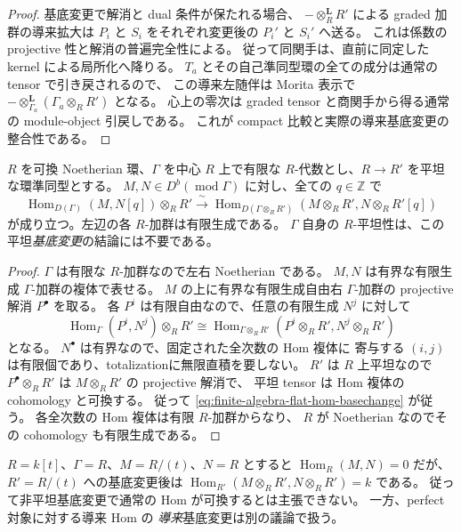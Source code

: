 \begin{proof}
基底変更で解消と dual 条件が保たれる場合、
$-\otimes_R^{\mathbf L}R'$ による graded 加群の導来拡大は
$P_i$ と $S_i$ をそれぞれ変更後の $P_i'$ と $S_i'$ へ送る。
これは係数の projective 性と解消の普遍完全性による。
従って同関手は、直前に同定した kernel による局所化へ降りる。
$T_a$ とその自己準同型環の全ての成分は通常の tensor で引き戻されるので、
この導来左随伴は Morita 表示で
$-\otimes_{\Gamma_a}^{\mathbf L}(\Gamma_a\otimes_RR')$ となる。
心上の零次は graded tensor と商関手から得る通常の module-object 引戻しである。
これが compact 比較と実際の導来基底変更の整合性である。
\end{proof}

\begin{lemma}
\label{lem:finite-algebra-flat-hom-basechange}
$R$ を可換 Noetherian 環、$\Gamma$ を中心 $R$ 上で有限な
$R$-代数とし、$R\to R'$ を平坦な環準同型とする。
$M,N\in D^b(\operatorname{mod}\Gamma)$ に対し、全ての $q\in\mathbb Z$ で
\[
 \operatorname{Hom}_{D(\Gamma)}(M,N[q])\otimes_RR'
 \xrightarrow{\ \sim\ }
 \operatorname{Hom}_{D(\Gamma\otimes_RR')}
     (M\otimes_RR',N\otimes_RR'[q])
 \tag{FA-BC}\label{eq:finite-algebra-flat-hom-basechange}
\]
が成り立つ。左辺の各 $R$-加群は有限生成である。
$\Gamma$ 自身の $R$-平坦性は、この平坦\emph{基底変更}の結論には不要である。
\end{lemma}
\begin{proof}
$\Gamma$ は有限な $R$-加群なので左右 Noetherian である。
$M,N$ は有界な有限生成 $\Gamma$-加群の複体で表せる。
$M$ の上に有界な有限生成自由右 $\Gamma$-加群の
projective 解消 $P^\bullet$ を取る。
各 $P^i$ は有限自由なので、任意の有限生成 $N^j$ に対して
\[
 \operatorname{Hom}_{\Gamma}(P^i,N^j)\otimes_RR'
 \cong
 \operatorname{Hom}_{\Gamma\otimes_RR'}
       (P^i\otimes_RR',N^j\otimes_RR')
\]
となる。
$N^\bullet$ は有界なので、固定された全次数の Hom 複体に
寄与する $(i,j)$ は有限個であり、totalizationに無限直積を要しない。
$R'$ は $R$ 上平坦なので $P^\bullet\otimes_RR'$ は
$M\otimes_RR'$ の projective 解消で、
平坦 tensor は Hom 複体の cohomology と可換する。
従って \eqref{eq:finite-algebra-flat-hom-basechange} が従う。
各全次数の Hom 複体は有限 $R$-加群からなり、
$R$ が Noetherian なのでその cohomology も有限生成である。
\end{proof}

\begin{remark}[非平坦基底変更には同じ結論を使わない]
\label{rem:nonflat-hom-basechange-warning}
$R=k[t]$、$\Gamma=R$、$M=R/(t)$、$N=R$ とすると
$\operatorname{Hom}_R(M,N)=0$ だが、
$R'=R/(t)$ への基底変更後は
$\operatorname{Hom}_{R'}(M\otimes_RR',N\otimes_RR')=k$ である。
従って非平坦基底変更で通常の Hom が可換するとは主張できない。
一方、perfect 対象に対する導来 Hom の
\emph{導来}基底変更は別の議論で扱う。
\end{remark}

